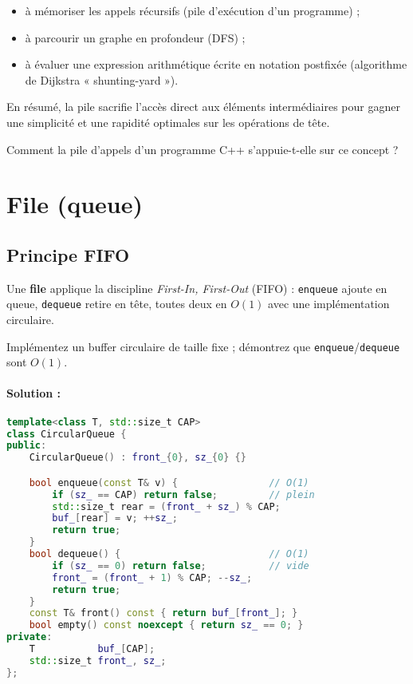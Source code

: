\begin{itemize}
  \item à mémoriser les appels récursifs (pile d’exécution d’un programme) ;
  \item à parcourir un graphe en profondeur (DFS) ;
  \item à évaluer une expression arithmétique écrite en notation postfixée
        (algorithme de Dijkstra « shunting-yard »).
\end{itemize}

En résumé, la pile sacrifie l’accès direct aux éléments intermédiaires pour
gagner une simplicité et une rapidité optimales sur les opérations de tête.

\begin{reflexion}
Comment la pile d’appels d’un programme C++ s’appuie-t-elle sur ce concept ?
\end{reflexion}

\section{File (queue)}

\subsection{Principe FIFO}
Une \textbf{file} applique la discipline \emph{First-In, First-Out}
(FIFO) :
\lstinline|enqueue| ajoute en queue, \lstinline|dequeue| retire en tête,
toutes deux en $O(1)$ avec une implémentation circulaire.

\begin{exercice}
Implémentez un buffer circulaire de taille fixe ; démontrez que
\lstinline|enqueue|/\lstinline|dequeue| sont $O(1)$.
\end{exercice}

\paragraph{Solution : }
\begin{lstlisting}[language=C++,caption={\texttt{circular\_queue.hpp}}]
template<class T, std::size_t CAP>
class CircularQueue {
public:
    CircularQueue() : front_{0}, sz_{0} {}

    bool enqueue(const T& v) {                // O(1)
        if (sz_ == CAP) return false;         // plein
        std::size_t rear = (front_ + sz_) % CAP;
        buf_[rear] = v; ++sz_;
        return true;
    }
    bool dequeue() {                          // O(1)
        if (sz_ == 0) return false;           // vide
        front_ = (front_ + 1) % CAP; --sz_;
        return true;
    }
    const T& front() const { return buf_[front_]; }
    bool empty() const noexcept { return sz_ == 0; }
private:
    T           buf_[CAP];
    std::size_t front_, sz_;
};
\end{lstlisting}

